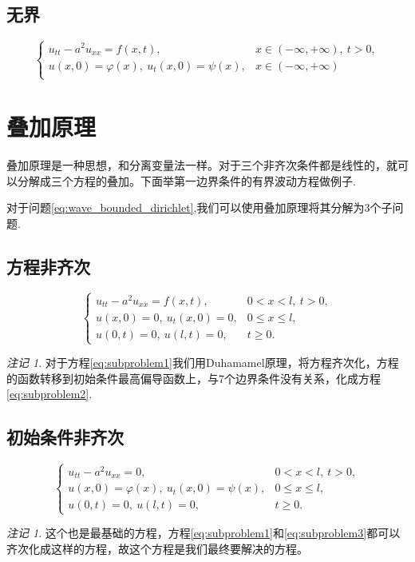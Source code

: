 \documentclass[a4paper, 12pt, oneside]{article} %
\numberwithin{subsection}{section}
\numberwithin{subsubsection}{subsection}
\theoremstyle{plain}
\theoremstyle{definition}
\theoremstyle{remark}
\newtheorem{remark}[theorem]{注记}
\begin{document}
		\subsection{无界}
		
		\begin{equation}\label{eq:wave_unbounded}
			\begin{cases}
				u_{tt} - a^2 u_{xx} = f(x, t), &  x \in (-\infty , +\infty), \ t > 0, \\
				u(x, 0) = \varphi(x), \ u_t(x, 0) = \psi(x), & x \in (-\infty , +\infty) \\
			\end{cases}
		\end{equation}
		
		

		\section{叠加原理}
		叠加原理是一种思想，和分离变量法一样。对于三个非齐次条件都是线性的，就可以分解成三个方程的叠加。下面举第一边界条件的有界波动方程做例子.
		
		对于问题\eqref{eq:wave_bounded_dirichlet},我们可以使用叠加原理将其分解为3个子问题.
		\subsection{方程非齐次}
		\begin{equation}\label{eq:subproblem1}
			\begin{cases}
				u_{tt} - a^2 u_{xx} = f(x, t), & 0 < x < l, \ t > 0, \\
				u(x, 0) = 0, \ u_t(x, 0) = 0, & 0 \leq x \leq l, \\
				u(0, t) = 0, \ u(l, t) = 0, & t \geq 0.
			\end{cases}
		\end{equation}
		\begin{remark}
			对于方程\eqref{eq:subproblem1}我们用Duhamamel原理，将方程齐次化，方程的函数转移到初始条件最高偏导函数上，与7个边界条件没有关系，化成方程\eqref{eq:subproblem2}.
		\end{remark}
		
		\subsection{初始条件非齐次}
		\begin{equation}\label{eq:subproblem2}
			\begin{cases}
				u_{tt} - a^2 u_{xx} = 0, & 0 < x < l, \ t > 0, \\
				u(x, 0) = \varphi(x), \ u_t(x, 0) = \psi(x), & 0 \leq x \leq l, \\
				u(0, t) = 0, \ u(l, t) = 0, & t \geq 0.
			\end{cases}
		\end{equation}
		\begin{remark}
			这个也是最基础的方程，方程\eqref{eq:subproblem1}和\eqref{eq:subproblem3}都可以齐次化成这样的方程，故这个方程是我们最终要解决的方程。
		\end{remark}
		
\end{document}
